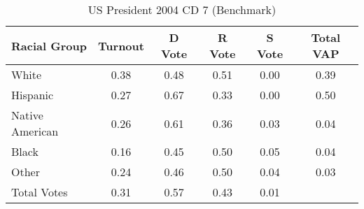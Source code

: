 \begin{table}[htb]
\begin{center}
\caption{US President 2004 CD 7 (Benchmark)}
\label{pres04_vap_cd_7_benchmark}
\begin{tabular}{lccccc}
  \hline
Racial Group & Turnout & D Vote & R Vote & S Vote & Total VAP \\ 
  \hline
White & 0.38 & 0.48 & 0.51 & 0.00 & 0.39 \\ 
  Hispanic & 0.27 & 0.67 & 0.33 & 0.00 & 0.50 \\ 
  Native American & 0.26 & 0.61 & 0.36 & 0.03 & 0.04 \\ 
  Black & 0.16 & 0.45 & 0.50 & 0.05 & 0.04 \\ 
  Other & 0.24 & 0.46 & 0.50 & 0.04 & 0.03 \\ 
  Total Votes & 0.31 & 0.57 & 0.43 & 0.01 &  \\ 
   \hline
\end{tabular}
\end{center}
\end{table}
